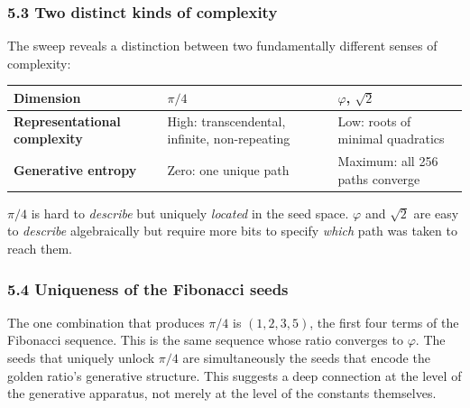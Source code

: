 \documentclass[
  11pt,
  letterpaper,
]{article}
\begin{document}
\subsubsection{5.3 Two distinct kinds of
complexity}\label{two-distinct-kinds-of-complexity}

The sweep reveals a distinction between two fundamentally different
senses of complexity:

\begin{longtable}[]{@{}
  >{\raggedright\arraybackslash}p{}
  >{\raggedright\arraybackslash}p{}
  >{\raggedright\arraybackslash}p{}@{}}
\toprule\noalign{}
\begin{minipage}[b]{\linewidth}\raggedright
Dimension
\end{minipage} & \begin{minipage}[b]{\linewidth}\raggedright
\(\pi/4\)
\end{minipage} & \begin{minipage}[b]{\linewidth}\raggedright
\(\varphi\), \(\sqrt{2}\)
\end{minipage} \\
\midrule\noalign{}
\endhead
\bottomrule\noalign{}
\endlastfoot
\textbf{Representational complexity} & High: transcendental, infinite,
non-repeating & Low: roots of minimal quadratics \\
\textbf{Generative entropy} & Zero: one unique path & Maximum: all 256
paths converge \\
\end{longtable}

\(\pi/4\) is hard to \emph{describe} but uniquely \emph{located} in the
seed space. \(\varphi\) and \(\sqrt{2}\) are easy to \emph{describe}
algebraically but require more bits to specify \emph{which} path was
taken to reach them.

\subsubsection{5.4 Uniqueness of the Fibonacci
seeds}\label{uniqueness-of-the-fibonacci-seeds}

The one combination that produces \(\pi/4\) is \((1, 2, 3, 5)\), the
first four terms of the Fibonacci sequence. This is the same sequence
whose ratio converges to \(\varphi\). The seeds that uniquely unlock
\(\pi/4\) are simultaneously the seeds that encode the golden ratio's
generative structure. This suggests a deep connection at the level of
the generative apparatus, not merely at the level of the constants
themselves.
\end{document}
